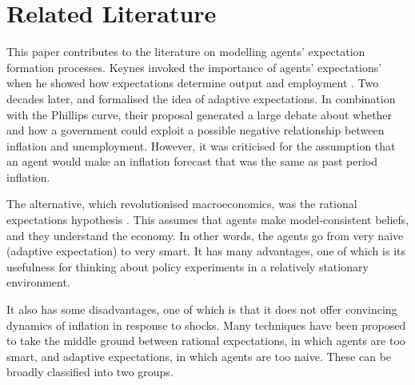 \documentclass[hidelinks]{article}
\begin{document}
\vspace{1.0cm}

\section{Related Literature}
\label{lit}


This paper contributes to the literature on modelling agents' expectation formation processes. Keynes invoked the importance of agents' expectations' when he showed how expectations determine output and employment \citep{Keynes:1936}. Two decades later, \cite{Cagan1956} and \cite{Friedman1957} formalised the idea of adaptive expectations. In combination with the Phillips curve, their proposal generated a large debate about whether and how a government could exploit a possible negative relationship between inflation and unemployment. However, it was criticised for the assumption that an agent would make an inflation forecast that was the same as past period inflation. 

The alternative, which revolutionised macroeconomics, was the rational expectations hypothesis \citep{LUCAS1972103, LUCAS197619, Sargent1971, Sargent19733}. This assumes that agents make model-consistent beliefs, and they understand the economy. In other words, the agents go from very naive (adaptive expectation) to very smart. It has many advantages, one of which is its usefulness for thinking about policy experiments in a relatively stationary environment. 

It also has some disadvantages, one of which is that it does not offer convincing dynamics of inflation in response to shocks. Many techniques have been proposed to take the middle ground between rational expectations, in which agents are too smart,  and adaptive expectations, in which agents are too naive. These can be broadly classified into two groups.

\end{document}
